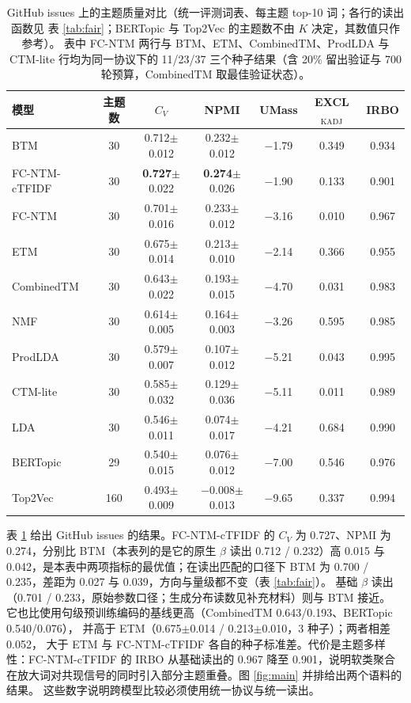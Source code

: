 \documentclass[11pt]{ctexart}
\newcommand{\fcntm}{FC-NTM}
\begin{document}
\begin{table}[t]
\centering
\caption{GitHub issues 上的主题质量对比（统一评测词表、每主题 top-10 词；各行的读出函数见
表 \ref{tab:fair}；BERTopic 与 Top2Vec 的主题数不由 $K$ 决定，其数值只作参考）。
表中 \fcntm{} 两行与 BTM、ETM、CombinedTM、ProdLDA 与 CTM-lite 行均为同一协议下的
11/23/37 三个种子结果（含 20\% 留出验证与 700 轮预算，CombinedTM 取最佳验证状态）。}
\label{tab:github}
\small
\begin{tabular}{lcccccc}
\toprule
模型 & 主题数 & $C_V$ & NPMI & UMass & EXCL$_{\mathrm{KADJ}}$ & IRBO \\
\midrule
BTM & 30 & 0.712$\pm$0.012 & 0.232$\pm$0.012 & $-$1.79 & 0.349 & 0.934 \\
\fcntm{}-cTFIDF & 30 & \textbf{0.727}$\pm$0.022 & \textbf{0.274}$\pm$0.026 & $-$1.90 & 0.133 & 0.901 \\
\fcntm{} & 30 & 0.701$\pm$0.016 & 0.233$\pm$0.012 & $-$3.16 & 0.010 & 0.967 \\
ETM & 30 & 0.675$\pm$0.014 & 0.213$\pm$0.010 & $-$2.14 & 0.366 & 0.955 \\
CombinedTM & 30 & 0.643$\pm$0.022 & 0.193$\pm$0.015 & $-$4.70 & 0.031 & 0.983 \\
NMF & 30 & 0.614$\pm$0.005 & 0.164$\pm$0.003 & $-$3.26 & 0.595 & 0.985 \\
ProdLDA & 30 & 0.579$\pm$0.007 & 0.107$\pm$0.012 & $-$5.21 & 0.043 & 0.995 \\
CTM-lite & 30 & 0.585$\pm$0.032 & 0.129$\pm$0.036 & $-$5.11 & 0.011 & 0.989 \\
LDA & 30 & 0.546$\pm$0.011 & 0.074$\pm$0.017 & $-$4.21 & 0.684 & 0.990 \\
BERTopic & 29 & 0.540$\pm$0.015 & 0.076$\pm$0.012 & $-$7.00 & 0.546 & 0.976 \\
Top2Vec & 160 & 0.493$\pm$0.009 & $-$0.008$\pm$0.013 & $-$9.65 & 0.337 & 0.994 \\
\bottomrule
\end{tabular}
\end{table}

表 \ref{tab:github} 给出 GitHub issues 的结果。\fcntm{}-cTFIDF 的
$C_V$ 为 0.727、NPMI 为 0.274，分别比 BTM（本表列的是它的原生 $\beta$ 读出
0.712 / 0.232）高 0.015 与 0.042，是本表中两项指标的最优值；在读出匹配的口径下 BTM
为 0.700 / 0.235，差距为 0.027 与 0.039，方向与量级都不变（表 \ref{tab:fair}）。
基础 $\beta$ 读出（0.701 / 0.233，原始参数口径；生成分布读数见补充材料）则与 BTM 接近。
它也比使用句级预训练编码的基线更高（CombinedTM 0.643/0.193、BERTopic 0.540/0.076），
并高于 ETM（0.675$\pm$0.014 / 0.213$\pm$0.010，3 种子）；两者相差 0.052，
大于 ETM 与 \fcntm{}-cTFIDF 各自的种子标准差。代价是主题多样性：\fcntm{}-cTFIDF 的 IRBO 从基础读出的 0.967
降至 0.901，说明软类聚合在放大词对共现信号的同时引入部分主题重叠。图
\ref{fig:main} 并排给出两个语料的结果。
这些数字说明跨模型比较必须使用统一协议与统一读出。
\end{document}
